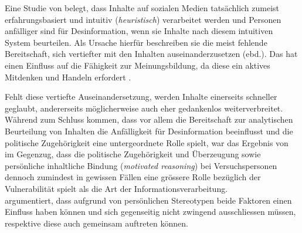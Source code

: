 \documentclass[12pt,a4paper]{article}        %
\begin{document}
Eine Studie von \textcite[48]{pennycook_lazy_2019} belegt, dass Inhalte auf sozialen Medien tatsächlich zumeist erfahrungsbasiert und intuitiv (\textit{heuristisch}) verarbeitet werden und Personen anfälliger sind für Desinformation, wenn sie Inhalte nach diesem intuitiven System beurteilen. Als Ursache hierfür beschreiben sie die meist fehlende Bereitschaft, sich vertiefter mit den Inhalten auseinanderzusetzen (ebd.). Das hat einen Einfluss auf die Fähigkeit zur Meinungsbildung, da diese ein aktives Mitdenken und Handeln erfordert \parencite[216]{schmidt_meinungsbildung_2022}.

\pagebreak
Fehlt diese vertiefte Auseinandersetzung, werden Inhalte einerseits schneller geglaubt, andererseits möglicherweise auch eher gedankenlos weiterverbreitet.\\
Während \textcite{pennycook_lazy_2019} zum Schluss kommen, dass vor allem die Bereitschaft zur analytischen Beurteilung von Inhalten die Anfälligkeit für Desinformation beeinflusst und die politische Zugehörigkeit eine untergeordnete Rolle spielt, war das Ergebnis von \textcite[502]{schaewitz_when_2020} im Gegenzug, dass die politische Zugehörigkeit und Überzeugung sowie persönliche inhaltliche Bindung (\textit{motivated reasoning}) bei Versuchspersonen dennoch zumindest in gewissen Fällen eine grössere Rolle bezüglich der Vulnerabilität spielt als die Art der Informationsverarbeitung. \\
\textcite[24]{zoglauer_konstruierte_2021} argumentiert, dass aufgrund von persönlichen Stereotypen beide Faktoren einen Einfluss haben können und sich gegenseitig nicht zwingend ausschliessen müssen, respektive diese auch gemeinsam auftreten können.
\end{document}

